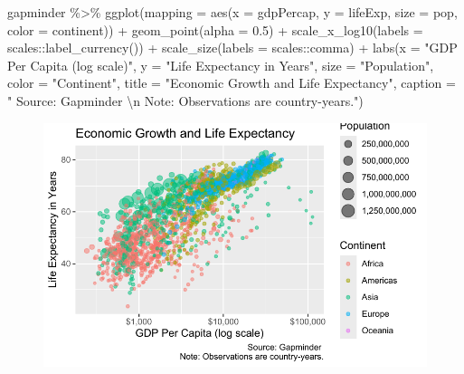 \documentclass[
  letterpaper,
]{book}
\newenvironment{Shaded}{\begin{snugshade}}{\end{snugshade}}
\newcommand{\AttributeTok}[1]{\textcolor[rgb]{0.40,0.45,0.13}{#1}}
\newcommand{\FloatTok}[1]{\textcolor[rgb]{0.68,0.00,0.00}{#1}}
\newcommand{\FunctionTok}[1]{\textcolor[rgb]{0.28,0.35,0.67}{#1}}
\newcommand{\NormalTok}[1]{\textcolor[rgb]{0.00,0.23,0.31}{#1}}
\newcommand{\SpecialCharTok}[1]{\textcolor[rgb]{0.37,0.37,0.37}{#1}}
\newcommand{\StringTok}[1]{\textcolor[rgb]{0.13,0.47,0.30}{#1}}
\begin{document}
\begin{Shaded}
\begin{Highlighting}[]
\NormalTok{gapminder }\SpecialCharTok{\%\textgreater{}\%}
  \FunctionTok{ggplot}\NormalTok{(}\AttributeTok{mapping =} \FunctionTok{aes}\NormalTok{(}\AttributeTok{x =}\NormalTok{ gdpPercap, }
                       \AttributeTok{y =}\NormalTok{ lifeExp,}
                       \AttributeTok{size =}\NormalTok{ pop,}
                       \AttributeTok{color =}\NormalTok{ continent)) }\SpecialCharTok{+}
  \FunctionTok{geom\_point}\NormalTok{(}\AttributeTok{alpha =} \FloatTok{0.5}\NormalTok{) }\SpecialCharTok{+} 
  \FunctionTok{scale\_x\_log10}\NormalTok{(}\AttributeTok{labels =}\NormalTok{ scales}\SpecialCharTok{::}\FunctionTok{label\_currency}\NormalTok{()) }\SpecialCharTok{+}
  \FunctionTok{scale\_size}\NormalTok{(}\AttributeTok{labels =}\NormalTok{ scales}\SpecialCharTok{::}\NormalTok{comma) }\SpecialCharTok{+}
  \FunctionTok{labs}\NormalTok{(}\AttributeTok{x =} \StringTok{"GDP Per Capita (log scale)"}\NormalTok{,}
       \AttributeTok{y =} \StringTok{"Life Expectancy in Years"}\NormalTok{,}
       \AttributeTok{size =} \StringTok{"Population"}\NormalTok{,}
       \AttributeTok{color =} \StringTok{"Continent"}\NormalTok{,}
       \AttributeTok{title =} \StringTok{"Economic Growth and Life Expectancy"}\NormalTok{,}
       \AttributeTok{caption =} \StringTok{" Source: Gapminder }\SpecialCharTok{\textbackslash{}n}\StringTok{ Note: Observations are country{-}years."}\NormalTok{)}
\end{Highlighting}
\end{Shaded}

\begin{figure}[H]

{\centering \includegraphics{visualizing-with-ggplot_files/figure-pdf/unnamed-chunk-25-1.pdf}

}

\end{figure}
\end{document}
